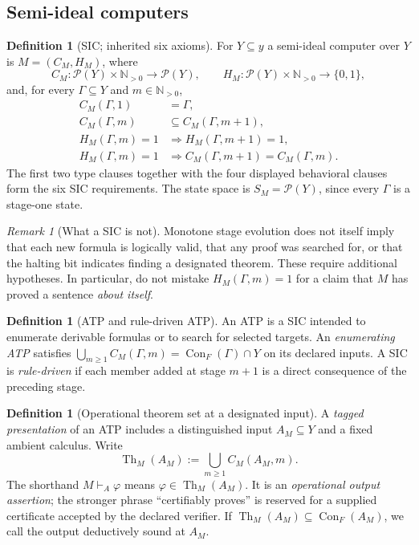 \documentclass[11pt,letterpaper]{article}
\theoremstyle{definition}\newtheorem{definition}[theorem]{Definition}\newtheorem{example}[theorem]{Example}\newtheorem{protocol}[theorem]{Protocol}\newtheorem{question}[theorem]{Open Problem}
\theoremstyle{remark}\newtheorem{remark}[theorem]{Remark}
\newcommand{\N}{\mathbb N}\newcommand{\Pset}{\mathcal P}\newcommand{\Con}{\operatorname{Con}}
\newcommand{\Th}{\operatorname{Th}}
\newcommand{\Nth}{\N_{>0}}
\begin{document}
\subsection{Semi-ideal computers}
\begin{definition}[SIC; inherited six axioms]
For $Y\subseteq y$ a semi-ideal computer over $Y$ is $M=(C_M,H_M)$, where
\[
C_M:\Pset(Y)\times\Nth\to\Pset(Y),\qquad
H_M:\Pset(Y)\times\Nth\to\{0,1\},
\]
and, for every $\Gamma\subseteq Y$ and $m\in\Nth$,
\begin{align*}
C_M(\Gamma,1)&=\Gamma,\\
C_M(\Gamma,m)&\subseteq C_M(\Gamma,m+1),\\
H_M(\Gamma,m)=1&\Longrightarrow H_M(\Gamma,m+1)=1,\\
H_M(\Gamma,m)=1&\Longrightarrow C_M(\Gamma,m+1)=C_M(\Gamma,m).
\end{align*}
The first two type clauses together with the four displayed behavioral clauses form the six SIC requirements. The state space is $S_M=\Pset(Y)$, since every $\Gamma$ is a stage-one state.
\end{definition}
\begin{remark}[What a SIC is not]
Monotone stage evolution does not itself imply that each new formula is logically valid, that any proof was searched for, or that the halting bit indicates finding a designated theorem. These require additional hypotheses. In particular, do not mistake $H_M(\Gamma,m)=1$ for a claim that $M$ has proved a sentence \emph{about itself}.
\end{remark}
\begin{definition}[ATP and rule-driven ATP]
An ATP is a SIC intended to enumerate derivable formulas or to search for selected targets. An \emph{enumerating ATP} satisfies $\bigcup_{m\ge1}C_M(\Gamma,m)=\Con_F(\Gamma)\cap Y$ on its declared inputs. A SIC is \emph{rule-driven} if each member added at stage $m+1$ is a direct consequence of the preceding stage.
\end{definition}
\begin{definition}[Operational theorem set at a designated input]
A \emph{tagged presentation} of an ATP includes a distinguished input $A_M\subseteq Y$ and a fixed ambient calculus. Write
\[
\Th_M(A_M):=\bigcup_{m\ge1}C_M(A_M,m).
\]
The shorthand $M\vdash_A\varphi$ means $\varphi\in\Th_M(A_M)$. It is an \emph{operational output assertion}; the stronger phrase ``certifiably proves'' is reserved for a supplied certificate accepted by the declared verifier. If $\Th_M(A_M)\subseteq\Con_F(A_M)$, we call the output deductively sound at $A_M$.
\end{definition}
\end{document}
